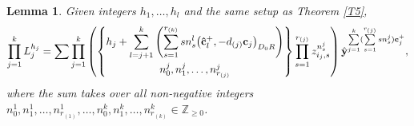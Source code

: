 \documentclass[pdftex]{sigma}
\numberwithin{equation}{section}
\newtheorem{Lemma}[Theorem]{Lemma}
\begin{document}
\begin{Lemma}\label{L4}
 Given integers $h_1,\dots,h_l$ and the same setup as Theorem {\rm\ref{T5}},
\begin{align*} \prod\limits_{j=1}^{k}L_j^{h_j}=\sum\prod\limits_{j=1}^{k}
\left(\begin{matrix}
 \begin{Bmatrix}\displaystyle h_j+\sum\limits_{l=j+1}^{k}\left(\sum\limits_{s=1}^{r_{(k)}}sn_{s}^{l}\bigl(\mathbf{\hat{c}}_{l}^+,-d_{(j)} \mathbf{c}_{j}\bigr)_{D_0R}\right)\vspace{1mm}\\n_0^j,n_{1}^j,\dots,n_{r_{(j)}}^j\end{Bmatrix}
\end{matrix}\prod\limits_{s=1}^{r_{(j)}}z_{i_j,s}^{n_s^j}\right)
 \hat{\mathbf{y}}^{\sum\limits_{j=1}^{k}(\sum\limits_{s=1}^{r_{(j)}}sn_s^j)\mathbf{c}_{j}^+},
 \end{align*}
 where the sum takes over all non-negative integers $n_0^1,n_{1}^{1},\dots,n_{r_{(1)}}^1,\dots,n_0^{k},n_{1}^{k},\dots,n_{r_{(k)}}^k\in\mathbb{Z}_{\ge0}$.

\end{Lemma}
\end{document}

